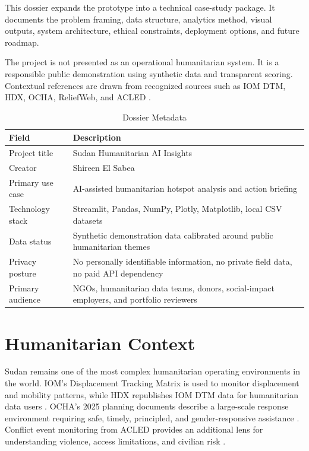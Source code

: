 \documentclass[11pt,a4paper]{article}
\begin{document}
This dossier expands the prototype into a technical case-study package. It documents the problem framing, data structure, analytics method, visual outputs, system architecture, ethical constraints, deployment options, and future roadmap.

The project is not presented as an operational humanitarian system. It is a responsible public demonstration using synthetic data and transparent scoring. Contextual references are drawn from recognized sources such as IOM DTM, HDX, OCHA, ReliefWeb, and ACLED \cite{iomdtm,hdxdtm,ocha2025,reliefweb2025,acledsudan}.

\begin{table}[H]
\centering
\caption{Dossier Metadata}
\begin{tabularx}{\textwidth}{p{}Y}
\toprule
\textbf{Field} & \textbf{Description} \\
\midrule
Project title & Sudan Humanitarian AI Insights \\
Creator & Shireen El Sabea \\
Primary use case & AI-assisted humanitarian hotspot analysis and action briefing \\
Technology stack & Streamlit, Pandas, NumPy, Plotly, Matplotlib, local CSV datasets \\
Data status & Synthetic demonstration data calibrated around public humanitarian themes \\
Privacy posture & No personally identifiable information, no private field data, no paid API dependency \\
Primary audience & NGOs, humanitarian data teams, donors, social-impact employers, and portfolio reviewers \\
\bottomrule
\end{tabularx}
\end{table}

\section{Humanitarian Context}

Sudan remains one of the most complex humanitarian operating environments in the world. IOM's Displacement Tracking Matrix is used to monitor displacement and mobility patterns, while HDX republishes IOM DTM data for humanitarian data users \cite{iomdtm,hdxdtm}. OCHA's 2025 planning documents describe a large-scale response environment requiring safe, timely, principled, and gender-responsive assistance \cite{ocha2025}. Conflict event monitoring from ACLED provides an additional lens for understanding violence, access limitations, and civilian risk \cite{acledsudan,acledfatality}.
\end{document}
